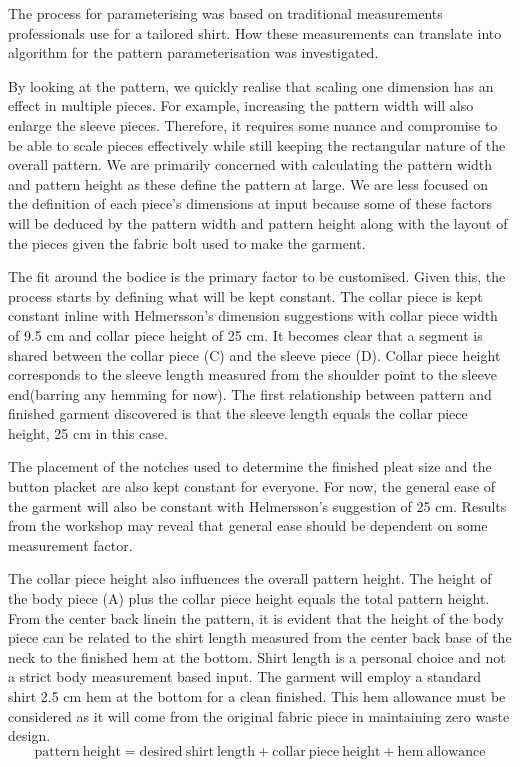 The process for parameterising was based on traditional measurements professionals use for a tailored shirt. How these measurements can translate into algorithm for the pattern parameterisation was investigated.

By looking at the pattern, we quickly realise that scaling one dimension has an effect in multiple pieces. For example, increasing the pattern width will also enlarge the sleeve pieces. Therefore, it requires some nuance and compromise to be able to scale pieces effectively while still keeping the rectangular nature of the overall pattern. We are primarily concerned with calculating the pattern width and pattern height as these define the pattern at large. We are less focused on the definition of each piece's dimensions at input because some of these factors will be deduced by the pattern width and pattern height along with the layout of the pieces given the fabric bolt used to make the garment.

The fit around the bodice is the primary factor to be customised. Given this, the process starts by defining what will be kept constant. The collar piece is kept constant inline with Helmersson's dimension suggestions with collar piece width of 9.5 cm and collar piece height of 25 cm. It becomes clear that a segment is shared between the collar piece (C) and the sleeve piece (D). Collar piece height corresponds to the sleeve length measured from the shoulder point to the sleeve end(barring any hemming for now). The first relationship between pattern and finished garment discovered is that the sleeve length equals the collar piece height, 25 cm in this case.

The placement of the notches used to determine the finished pleat size and the button placket are also kept constant for everyone. For now, the general ease of the garment will also be constant with Helmersson's suggestion of 25 cm. Results from the workshop may reveal that general ease should be dependent on some measurement factor.

The collar piece height also influences the overall pattern height. The height of the body piece (A) plus the collar piece height equals the total pattern height. From the center back linein the pattern, it is evident that the height of the body piece can be related to the shirt length measured from the center back base of the neck to the finished hem at the bottom. Shirt length is a personal choice and not a strict body measurement based input. The garment will employ a standard shirt 2.5 cm hem at the bottom for a clean finished. This hem allowance must be considered as it will come from the original fabric piece in maintaining zero waste design.
\begin{equation}
    \mathrm{pattern\ height} = \mathrm{desired\ shirt\ length} + \mathrm{collar\ piece\ height} + \mathrm{hem\ allowance}
    \label{eq:pattern height}
\end{equation}


